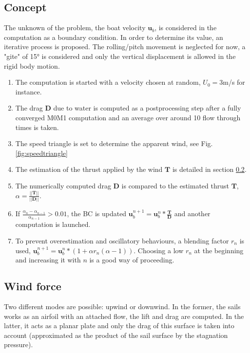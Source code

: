 \subsection{Concept}

    The unknown of the problem, the boat velocity $\mathbf{u}_b$, is considered in the computation as a boundary condition. In order to determine its value, an iterative process is proposed. 
    The rolling/pitch movement is neglected for now, a "gite" of 15° is considered and only the vertical displacement is allowed in the rigid body motion. 


    \begin{enumerate}
        \item The computation is started with a velocity chosen at random, $U_0 = 3$m/s for instance. 
        \item The drag $\mathbf{D}$ due to water is computed as a postprocessing step after a fully converged M0M1 computation and an average over around 10 flow through times is taken. 
        \item The speed triangle is set to determine the apparent wind, see Fig. \ref{fig:speedtriangle}
        \item The estimation of the thrust applied by the wind $\mathbf{T}$ is detailed in section \ref{section:wind_force}.
        \item The numerically computed drag $\mathbf{D}$ is compared to the estimated thrust $\mathbf{T}$, $\alpha=\frac{||\mathbf{T}||}{||\mathbf{D}||}$.
        \item If $\frac{\alpha_n-\alpha_{n-1}}{\alpha_{n-1}} > 0.01$, the BC is updated $\mathbf{u}_b^{n+1}=\mathbf{u}_b^{n}*\frac{\mathbf{T}}{\mathbf{D}}$ and another computation is launched. 
        \item To prevent overestimation and oscillatory behaviours, a blending factor $r_n$ is used, $\mathbf{u}_b^{n+1}=\mathbf{u}_b^{n}*(1+\alpha r_n(\alpha-1))$. Choosing a low $r_n$ at the beginning and increasing it with $n$ is a good way of proceeding. 
    \end{enumerate}


\subsection{Wind force}
    \label{section:wind_force}
    Two different modes are possible: upwind or downwind. In the former, the sails works as an airfoil with an attached flow, the lift and drag are computed. In the latter, it acts as a planar plate and only the drag of this surface is taken into account (approximated as the product of the sail surface by the stagnation pressure).
    
